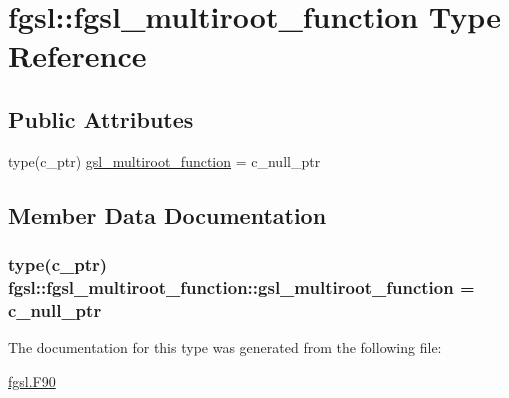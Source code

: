\hypertarget{structfgsl_1_1fgsl__multiroot__function}{}\section{fgsl\+:\+:fgsl\+\_\+multiroot\+\_\+function Type Reference}
\label{structfgsl_1_1fgsl__multiroot__function}
\subsection*{Public Attributes}
\begin{DoxyCompactItemize}
\item 
type(c\+\_\+ptr) \hyperlink{structfgsl_1_1fgsl__multiroot__function_a15fe7f7961e40dc0ac6a1de10cc8343f}{gsl\+\_\+multiroot\+\_\+function} = c\+\_\+null\+\_\+ptr
\end{DoxyCompactItemize}


\subsection{Member Data Documentation}
\hypertarget{structfgsl_1_1fgsl__multiroot__function_a15fe7f7961e40dc0ac6a1de10cc8343f}{}
\subsubsection[{gsl\+\_\+multiroot\+\_\+function}]{\setlength{\rightskip}{0pt plus 5cm}type(c\+\_\+ptr) fgsl\+::fgsl\+\_\+multiroot\+\_\+function\+::gsl\+\_\+multiroot\+\_\+function = c\+\_\+null\+\_\+ptr}\label{structfgsl_1_1fgsl__multiroot__function_a15fe7f7961e40dc0ac6a1de10cc8343f}


The documentation for this type was generated from the following file\+:\begin{DoxyCompactItemize}
\item 
\hyperlink{fgsl_8F90}{fgsl.\+F90}\end{DoxyCompactItemize}
